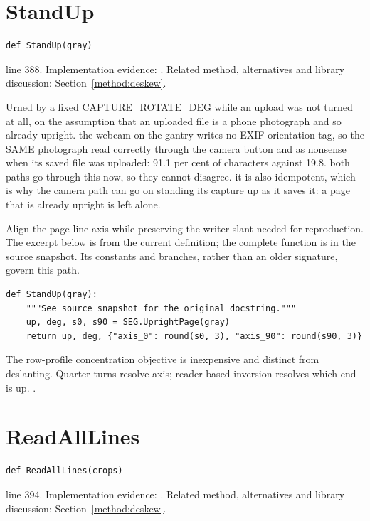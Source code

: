 \section{StandUp}\label{fn:web-server:StandUp}
\begin{lstlisting}[style=sig]
def StandUp(gray)
\end{lstlisting}
 line 388. Implementation evidence: \cite{code2026}. Related method, alternatives and library discussion: Section~\ref{method:deskew}.


Urned by a fixed CAPTURE\_ROTATE\_DEG while an upload was not turned at all, on the assumption that an uploaded file is a phone photograph and so already upright.  the webcam on the gantry writes no EXIF orientation tag, so the SAME photograph read correctly through the camera button and as nonsense when its saved file was uploaded: 91.1 per cent of characters against 19.8. both paths go through this now, so they cannot disagree.  it is also idempotent, which is why the camera path can go on standing its capture up as it saves it: a page that is already upright is left alone.


Align the page line axis while preserving the writer slant needed for reproduction. The excerpt below is from the current definition; the complete function is in the source snapshot. Its constants and branches, rather than an older signature, govern this path.


\begin{lstlisting}[style=plain]
def StandUp(gray):
    """See source snapshot for the original docstring."""
    up, deg, s0, s90 = SEG.UprightPage(gray)
    return up, deg, {"axis_0": round(s0, 3), "axis_90": round(s90, 3)}
\end{lstlisting}
The row-profile concentration objective is inexpensive and distinct from deslanting. Quarter turns resolve axis; reader-based inversion resolves which end is up. \cite{postl1986,wolberg1990,opencvtransform,pillowops}.


\section{ReadAllLines}\label{fn:web-server:ReadAllLines}
\begin{lstlisting}[style=sig]
def ReadAllLines(crops)
\end{lstlisting}
 line 394. Implementation evidence: \cite{code2026}. Related method, alternatives and library discussion: Section~\ref{method:deskew}.


